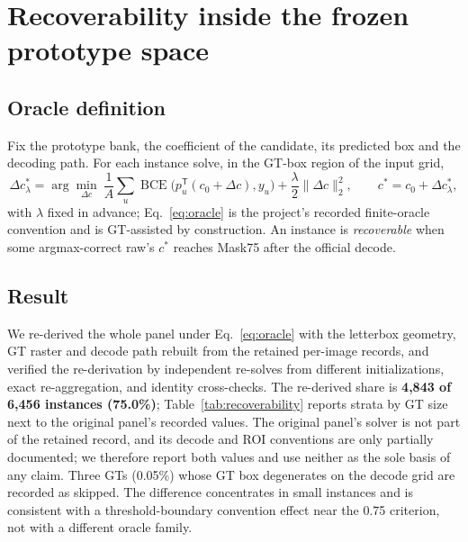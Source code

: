 ﻿\documentclass[times,twocolumn,final,authoryear]{elsarticle}
\begin{document}
\section{Recoverability inside the frozen prototype space}
\subsection{Oracle definition}
Fix the prototype bank, the coefficient of the candidate, its predicted box and the decoding path.
For each instance solve, in the GT-box region of the input grid,
\begin{equation}
\Delta c^{*}_{\lambda}=\arg\min_{\Delta c}\
\frac{1}{A}\sum_{u}\operatorname{BCE}\!\big(p_u^{\mathsf T}(c_0+\Delta c),y_u\big)
+\frac{\lambda}{2}\|\Delta c\|_2^2,\qquad
c^{*}=c_0+\Delta c^{*}_{\lambda},
\label{eq:oracle}
\end{equation}
with $\lambda$ fixed in advance; Eq.~\ref{eq:oracle} is the project's recorded finite-oracle
convention and is GT-assisted by construction. An instance is \emph{recoverable} when some
argmax-correct raw's $c^{*}$ reaches Mask75 after the official decode.

\subsection{Result}
\label{sec:recoverability}
We re-derived the whole panel under Eq.~\ref{eq:oracle} with the letterbox geometry, GT raster and
decode path rebuilt from the retained per-image records, and verified the re-derivation by
independent re-solves from different initializations, exact re-aggregation, and identity
cross-checks. The re-derived share is \textbf{4{,}843 of 6{,}456 instances (75.0\%)};
Table~\ref{tab:recoverability} reports strata by GT size next to the original panel's recorded
values. The original panel's solver is not part of the retained record, and its decode and ROI
conventions are only partially documented; we therefore report both values and use neither as the
sole basis of any claim. Three GTs (0.05\%) whose GT box degenerates on the decode grid are
recorded as skipped. The difference concentrates in small instances and is consistent with a
threshold-boundary convention effect near the 0.75 criterion, not with a different oracle family.
\end{document}
